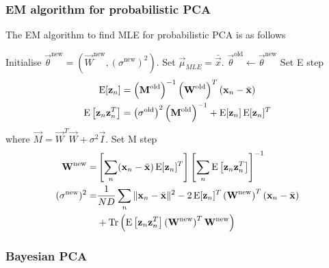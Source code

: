 \subsubsection{EM algorithm for probabilistic PCA}
The EM algorithm to find MLE for probabilistic PCA is as follows
\begin{algorithmbis}\label{alg:models-pca-em}
    \begin{algorithmic}[1]
    \State Initialise $\vec \theta^{\text{new}} = \left(\vec W^{\text{new}}, (\sigma^{\text{new}})^2\right)$. Set $\vec \mu_{MLE} = \bar{\vec x}$.
        \Repeat
            \State $\vec \theta^{\text{old}} \gets \vec \theta^{\text{new}}$
            \State Set \Comment E step
                \begin{align*}
                    \operatorname{\mathrm{E}}[\boldsymbol{\mathbf{z}}_n]                        &= \left(\boldsymbol{\mathbf{M}}^{\text{old}}\right)^{-1} \left(\boldsymbol{\mathbf{W}}^{\text{old}}\right)^T (\boldsymbol{\mathbf{x}}_n - \bar{\boldsymbol{\mathbf{x}}}) \\
                    \operatorname{\mathrm{E}}\left[\boldsymbol{\mathbf{z}}_n \boldsymbol{\mathbf{z}}_n^T\right]  &= \left(\sigma^{\text{old}}\right)^2 \left(\boldsymbol{\mathbf{M}}^{\text{old}}\right)^{-1} + \operatorname{\mathrm{E}}[\boldsymbol{\mathbf{z}}_n]\operatorname{\mathrm{E}}[\boldsymbol{\mathbf{z}}_n]^T
                \end{align*}
                where $\vec M = \vec W^T \vec W + \sigma^2 \vec I$.
            \State Set \Comment M step
                \begin{equation}
                \begin{split}
                    \boldsymbol{\mathbf{W}}^{\text{new}}     =   & \left[\sum_n (\boldsymbol{\mathbf{x}}_n - \bar{\boldsymbol{\mathbf{x}}})\operatorname{\mathrm{E}}[\boldsymbol{\mathbf{z}}_n]^T\right]\left[\sum_n \operatorname{\mathrm{E}}\left[\boldsymbol{\mathbf{z}}_n \boldsymbol{\mathbf{z}}_n^T\right]\right]^{-1} \\
                    (\sigma^{\text{new}})^2 =   & \frac{1}{ND} \sum_n \|\boldsymbol{\mathbf{x}}_n - \bar{\boldsymbol{\mathbf{x}}}\|^2 - 2\operatorname{\mathrm{E}}[\boldsymbol{\mathbf{z}}_n]^T\left(\boldsymbol{\mathbf{W}}^{\text{new}}\right)^T(\boldsymbol{\mathbf{x}}_n - \bar{\boldsymbol{\mathbf{x}}}) \\
                                                & + \operatorname{Tr}\left(\operatorname{\mathrm{E}}\left[\boldsymbol{\mathbf{z}}_n \boldsymbol{\mathbf{z}}_n^T\right] \left(\boldsymbol{\mathbf{W}}^{\text{new}}\right)^T \boldsymbol{\mathbf{W}}^{\text{new}} \right)
                \end{split}
                \end{equation}
    \end{algorithmic}
\end{algorithmbis}

\subsubsection{Bayesian PCA}